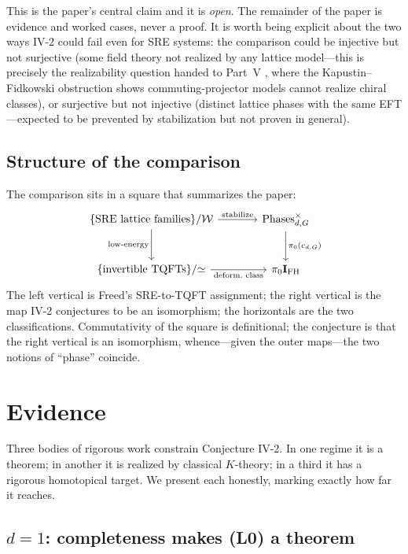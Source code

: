 \documentclass[12pt]{article}
\newcommand{\Phases}{\operatorname{Phases}}    %
\newcommand{\Weq}{\mathcal{W}}                 %
\newcommand{\IFH}{\mathbf{I}_{\mathrm{FH}}}  %
\theoremstyle{definition}
\theoremstyle{remark}
\theoremstyle{plain}
\begin{document}
This is the paper's central claim and it is \emph{open}. The remainder of the
paper is evidence and worked cases, never a proof. It is worth being explicit
about the two ways IV-2 could fail even for SRE systems: the comparison could be
injective but not surjective (some field theory not realized by any lattice
model---this is precisely the realizability question handed to Part~V
\cite{paperRealizability}, where the Kapustin--Fidkowski obstruction
\cite{kapustin-fidkowski} shows commuting-projector models cannot realize chiral
classes), or surjective but not injective (distinct lattice phases with the same
EFT---expected to be prevented by stabilization but not proven in general).

\subsection{Structure of the comparison}

The comparison sits in a square that summarizes the paper:
\[
\begin{tikzcd}[column sep=large, row sep=large]
\{\text{SRE lattice families}\}/\Weq \arrow[r, "\text{stabilize}"] \arrow[d, "\text{low-energy}"']
  & \Phases_{d,G}^{\times}\arrow[d, "\pi_0(c_{d,G})"] \\
\{\text{invertible TQFTs}\}/{\simeq} \arrow[r, "\text{deform.\ class}"']
  & \pi_0\IFH
\end{tikzcd}
\]
The left vertical is Freed's SRE-to-TQFT assignment; the right vertical is the
map IV-2 conjectures to be an isomorphism; the horizontals are the two
classifications. Commutativity of the square is definitional; the conjecture is
that the right vertical is an isomorphism, whence---given the outer maps---the
two notions of ``phase'' coincide.

\section{Evidence}
\label{sec:evidence}

Three bodies of rigorous work constrain Conjecture IV-2. In one regime it is a
theorem; in another it is realized by classical $K$-theory; in a third it has a
rigorous homotopical target. We present each honestly, marking exactly how far it
reaches.

\subsection{\texorpdfstring{$d=1$}{d=1}: completeness makes (L0) a theorem}
\end{document}
